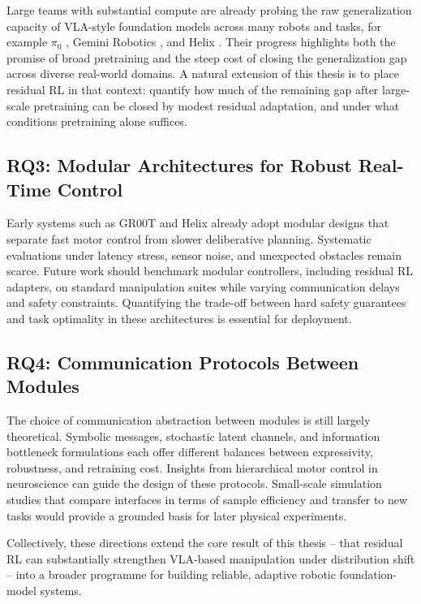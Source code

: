 Large teams with substantial compute are already probing the raw generalization capacity of VLA-style foundation models across many robots and tasks, for example $\pi_0$ \cite{PI0.52025}, Gemini Robotics \cite{GEMER2025}, and Helix \cite{HELIX2025}. Their progress highlights both the promise of broad pretraining and the steep cost of closing the generalization gap across diverse real-world domains. A natural extension of this thesis is to place residual RL in that context: quantify how much of the remaining gap after large-scale pretraining can be closed by modest residual adaptation, and under what conditions pretraining alone suffices.

\subsection{RQ3: Modular Architectures for Robust Real-Time Control}

Early systems such as GR00T and Helix already adopt modular designs that separate fast motor control from slower deliberative planning. Systematic evaluations under latency stress, sensor noise, and unexpected obstacles remain scarce. Future work should benchmark modular controllers, including residual RL adapters, on standard manipulation suites while varying communication delays and safety constraints. Quantifying the trade-off between hard safety guarantees and task optimality in these architectures is essential for deployment.

\subsection{RQ4: Communication Protocols Between Modules}

The choice of communication abstraction between modules is still largely theoretical. Symbolic messages, stochastic latent channels, and information bottleneck formulations each offer different balances between expressivity, robustness, and retraining cost. Insights from hierarchical motor control in neuroscience can guide the design of these protocols. Small-scale simulation studies that compare interfaces in terms of sample efficiency and transfer to new tasks would provide a grounded basis for later physical experiments.

Collectively, these directions extend the core result of this thesis – that residual RL can substantially strengthen VLA-based manipulation under distribution shift – into a broader programme for building reliable, adaptive robotic foundation-model systems.

\newpage
